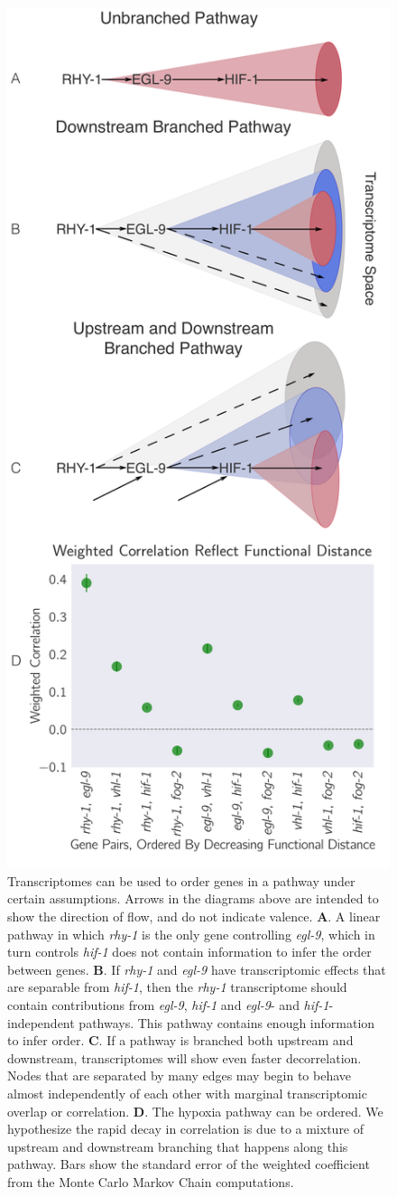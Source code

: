 \documentclass[9pt,twocolumn,twoside]{pnas-new}
\newcommand{\gene}[1]{\mbox{\emph{#1}}}
\begin{document}
\begin{figure}[tbhp]
  \centering
  \includegraphics[width=.4\textwidth]{../figs/decorrelation.pdf}
  \caption{
    Transcriptomes can be used to order genes in a pathway under
    certain assumptions. Arrows in the diagrams above are intended to show the
    direction of flow, and do not indicate valence. \textbf{A}. A linear pathway
    in which \gene{rhy-1} is the only gene controlling \gene{egl-9}, which in
    turn controls \gene{hif-1} does not contain information to infer the order
    between genes. \textbf{B}. If \gene{rhy-1} and \gene{egl-9} have
    transcriptomic effects that are separable from \gene{hif-1}, then the
    \gene{rhy-1} transcriptome should contain contributions from \gene{egl-9},
    \gene{hif-1} and \gene{egl-9}- and \gene{hif-1}-independent pathways. This
    pathway contains enough information to infer order. \textbf{C}. If a pathway
    is branched both upstream and downstream, transcriptomes will show even
    faster decorrelation. Nodes that are separated by many edges may begin to
    behave almost independently of each other with marginal transcriptomic
    overlap or correlation. \textbf{D}. The hypoxia pathway can be ordered. We
    hypothesize the rapid decay in correlation is due to a mixture of upstream
    and downstream branching that happens along this pathway. Bars show the
    standard error of the weighted coefficient from the Monte Carlo Markov Chain
    computations.
  }
\label{fig:decorrelation}
\end{figure}
\end{document}
